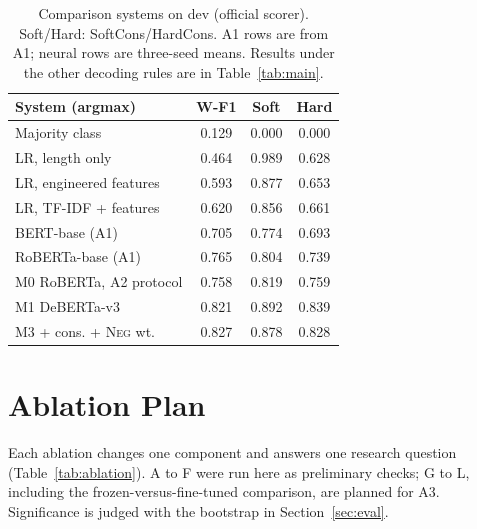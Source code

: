 \documentclass[10pt,a4paper,twocolumn]{article}
\newcommand{\Neg}{\textsc{Neg}}
\begin{document}
\begin{table}[!t]
\centering
\footnotesize
\setlength{\tabcolsep}{3.5pt}
\begin{tabular}{l ccc}
\toprule
System (argmax) & W-F1 & Soft & Hard \\
\midrule
Majority class & 0.129 & 0.000 & 0.000 \\
LR, length only & 0.464 & 0.989 & 0.628 \\
LR, engineered features & 0.593 & 0.877 & 0.653 \\
LR, TF-IDF + features & 0.620 & 0.856 & 0.661 \\
BERT-base (A1) & 0.705 & 0.774 & 0.693 \\
RoBERTa-base (A1) & 0.765 & 0.804 & 0.739 \\
\midrule
M0 RoBERTa, A2 protocol & 0.758 & 0.819 & 0.759 \\
M1 DeBERTa-v3 & 0.821 & 0.892 & 0.839 \\
M3 + cons. + \Neg{} wt. & 0.827 & 0.878 & 0.828 \\
\bottomrule
\end{tabular}
\caption{Comparison systems on dev (official scorer). Soft/Hard: SoftCons/HardCons. A1 rows are from A1; neural rows are three-seed means. Results under the other decoding rules are in Table~\ref{tab:main}.}
\label{tab:systems}
\end{table}

\section{Ablation Plan}
\label{sec:ablation}

Each ablation changes one component and answers one research question (Table~\ref{tab:ablation}). A to F were run here as preliminary checks; G to L, including the frozen-versus-fine-tuned comparison, are planned for A3. Significance is judged with the bootstrap in Section~\ref{sec:eval}.
\end{document}
